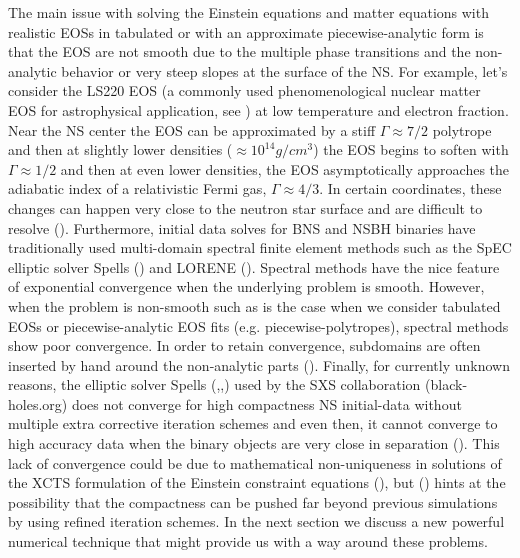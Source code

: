 The main issue with solving the Einstein equations and matter equations with realistic EOSs in tabulated or with an approximate piecewise-analytic form is that the EOS are not smooth due to the multiple phase transitions and the non-analytic behavior or very steep slopes at the surface of the NS. For example, let's consider the LS220 EOS (a commonly used phenomenological nuclear matter EOS for astrophysical application, see \cite{lattimer1991generalized}) at low temperature and electron fraction. Near the NS center the EOS can be approximated by a stiff $\Gamma \approx 7/2$ polytrope and then at slightly lower densities ($\approx 10^{14} g/cm^{3}$) the EOS begins to soften with $\Gamma \approx 1/2$ and then at even lower densities, the EOS asymptotically approaches the adiabatic index of a relativistic Fermi gas, $\Gamma \approx 4/3$. In certain coordinates, these changes can happen very close to the neutron star surface and are difficult to resolve (\cite{deaton2013black}). Furthermore, initial data solves for BNS and NSBH binaries have traditionally used multi-domain spectral finite element methods such as the SpEC elliptic solver Spells (\cite{pfeiffer2003multidomain}) and LORENE (\cite{gourgoulhon2001quasiequilibrium}). Spectral methods have the nice feature of exponential convergence when the underlying problem is smooth. However, when the problem is non-smooth such as is the case when we consider tabulated EOSs or piecewise-analytic EOS fits (e.g. piecewise-polytropes), spectral methods show poor convergence. In order to retain convergence, subdomains are often inserted by hand around the non-analytic parts (\cite{deaton2013black}). 
%
Finally, for currently unknown reasons, the elliptic solver Spells (\cite{pfeiffer2003multidomain},\cite{foucart2008initial},\cite{henriksson2014initial}) used by the SXS collaboration (black-holes.org) does not converge for high compactness NS initial-data without multiple extra corrective iteration schemes and even then, it cannot converge to high accuracy data when the binary objects are very close in separation (\cite{henriksson2014initial}). This lack of convergence could be due to mathematical non-uniqueness in solutions of the XCTS formulation of the Einstein constraint equations (\cite{cordero2009improved}), but (\cite{henriksson2014initial}) hints at the possibility that the compactness can be pushed far beyond previous simulations by using refined iteration schemes. In the next section we discuss a new powerful numerical technique that might provide us with a way around these problems.

